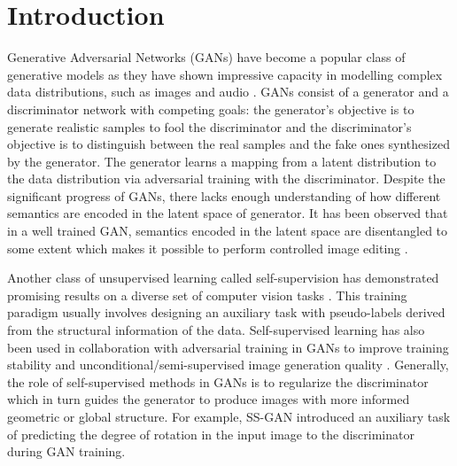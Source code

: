 \documentclass[10pt,twocolumn,letterpaper]{article}
\begin{document}
\section{Introduction}
Generative Adversarial Networks (GANs) have become a popular class of generative models as they have shown impressive capacity in modelling complex data distributions, such as images \cite{biggan2018brock,stylegan2019karras} and audio \cite{audio_GAN,audio_gan2}. GANs consist of a generator and a discriminator network with competing goals: the generator's objective is to generate realistic samples to fool the discriminator and the discriminator's objective is to distinguish between the real samples and the fake ones synthesized by the generator. The generator learns a mapping from a latent distribution to the data distribution via adversarial training with the discriminator. Despite the significant progress of GANs, there lacks enough understanding of how different semantics are encoded in the latent space of generator. It has been observed that in a well trained GAN, semantics encoded in the latent space are disentangled to some extent which makes it possible to perform controlled image editing \cite{interface2020shen,gansteerability, controlling2020iclr}. 






Another class of unsupervised learning called self-supervision has demonstrated promising results on a diverse set of computer vision tasks \cite{s2m22020, Spyros2018rotate, arrowtime2019abhinav, color2018,downstream2019abhinav}. This training paradigm usually involves designing an auxiliary task with pseudo-labels derived from the structural information of the data.
Self-supervised learning has also been used in collaboration with adversarial training in GANs \cite{rot_ssgan2019chen, fxgan2020wacv} to improve training stability and unconditional/semi-supervised image generation quality \cite{semisupervised2019icml}. Generally, the role of self-supervised methods in GANs is to regularize the discriminator which in turn guides the generator to produce images with more informed geometric or global structure. For example, SS-GAN \cite{rot_ssgan2019chen} introduced an auxiliary task of predicting the degree of rotation in the input image to the discriminator during GAN training.
\end{document}
